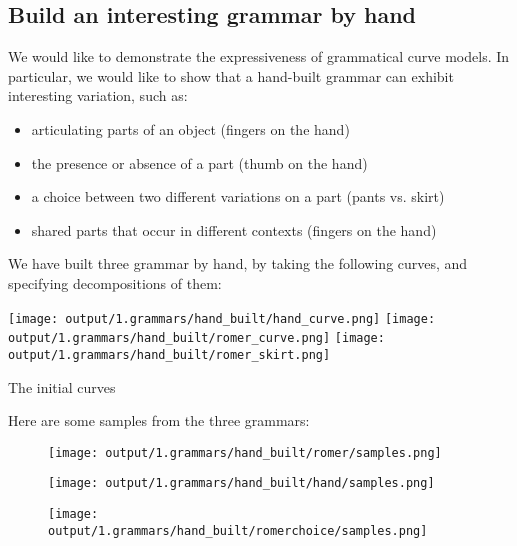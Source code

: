 

\subsection{Build an interesting grammar by hand}

We would like to demonstrate the expressiveness of grammatical curve
models. In particular, we would like to show that a hand-built grammar
can exhibit interesting variation, such as:
\begin{itemize}      
 \item articulating parts of an object (fingers on the hand)
 \item the presence or absence of a part (thumb on the hand)
 \item a choice between two different variations on a part (pants vs. skirt)
 \item shared parts that occur in different contexts (fingers on the hand)
\end{itemize}


We have built three grammar by hand, by taking the following curves, and
specifying decompositions of them:

\begin{marginfigure}
\texttt{[image: output/1.grammars/hand\_built/hand\_curve.png]}
\texttt{[image: output/1.grammars/hand\_built/romer\_curve.png]}
\texttt{[image: output/1.grammars/hand\_built/romer\_skirt.png]}
\caption{The initial curves}
\end{marginfigure}


Here are some samples from the three grammars:
\begin{figure}
\texttt{[image: output/1.grammars/hand\_built/romer/samples.png]}
\end{figure}

\begin{figure}
\texttt{[image: output/1.grammars/hand\_built/hand/samples.png]}
\end{figure}

\begin{figure}
\texttt{[image: output/1.grammars/hand\_built/romerchoice/samples.png]}
\end{figure}

